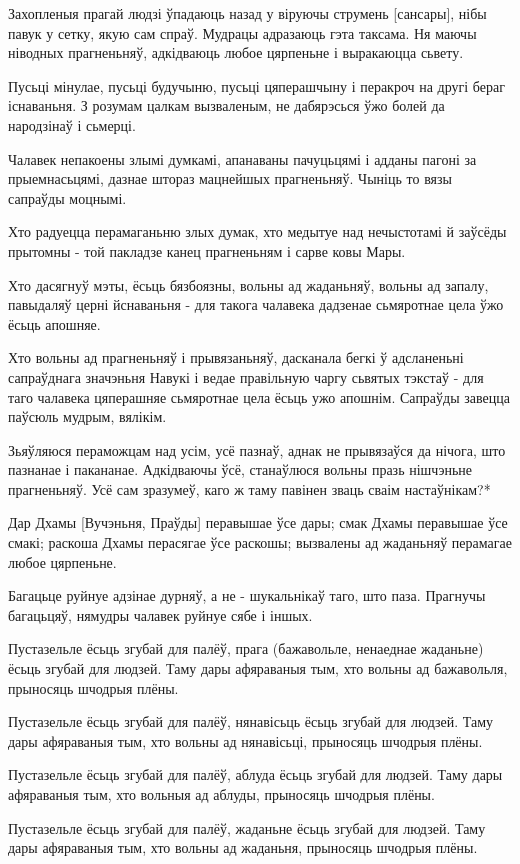 \documentclass{article}
\begin{document}
Захопленыя прагай людзі ўпадаюць назад у віруючы струмень
{[}сансары{]}, нібы павук у сетку, якую сам спраў. Мудрацы адразаюць
гэта таксама. Ня маючы ніводных прагненьняў, адкідваюць любое цярпеньне
і выракаюцца сьвету.

Пусьці мінулае, пусьці будучыню, пусьці цяперашчыну і перакроч на
другі бераг існаваньня. З розумам цалкам вызваленым, не дабярэсься ўжо
болей да народзінаў і сьмерці.

Чалавек непакоены злымі думкамі, апанаваны пачуцьцямі і адданы
пагоні за прыемнасьцямі, дазнае штораз мацнейшых прагненьняў. Чыніць то
вязы сапраўды моцнымі.

Хто радуецца перамаганьню злых думак, хто медытуе над нечыстотамі й
заўсёды прытомны - той пакладзе канец прагненьням і сарве ковы Мары.

Хто дасягнуў мэты, ёсьць бязбоязны, вольны ад жаданьняў, вольны ад
запалу, павыдаляў церні йснаваньня - для такога чалавека дадзенае
сьмяротнае цела ўжо ёсьць апошняе.

Хто вольны ад прагненьняў і прывязаньняў, дасканала бегкі ў
адсланеньні сапраўднага значэньня Навукі і ведае правільную чаргу
сьвятых тэкстаў - для таго чалавека цяперашняе сьмяротнае цела ёсьць ужо
апошнім. Сапраўды завецца паўсюль мудрым, вялікім.

Зьяўляюся пераможцам над усім, усё пазнаў, аднак не прывязаўся да
нічога, што пазнанае і пакананае. Адкідваючы ўсё, станаўлюся вольны
празь нішчэньне прагненьняў. Усё сам зразумеў, каго ж таму павінен зваць
сваім настаўнікам?*

Дар Дхамы {[}Вучэньня, Праўды{]} перавышае ўсе дары; смак Дхамы
перавышае ўсе смакі; раскоша Дхамы перасягае ўсе раскошы; вызвалены ад
жаданьняў перамагае любое цярпеньне.

Багацьце руйнуе адзінае дурняў, а не - шукальнікаў таго, што паза.
Прагнучы багацьцяў, нямудры чалавек руйнуе сябе і іншых.

Пустазельле ёсьць згубай для палёў, прага (бажавольле, ненаеднае
жаданьне) ёсьць згубай для людзей. Таму дары афяраваныя тым, хто вольны
ад бажавольля, прыносяць шчодрыя плёны.

Пустазельле ёсьць згубай для палёў, нянавісьць ёсьць згубай для
людзей. Таму дары афяраваныя тым, хто вольны ад нянавісьці, прыносяць
шчодрыя плёны.

Пустазельле ёсьць згубай для палёў, аблуда ёсьць згубай для людзей.
Таму дары афяраваныя тым, хто вольныя ад аблуды, прыносяць шчодрыя
плёны.

Пустазельле ёсьць згубай для палёў, жаданьне ёсьць згубай для
людзей. Таму дары афяраваныя тым, хто вольны ад жаданьня, прыносяць
шчодрыя плёны.
\end{document}
